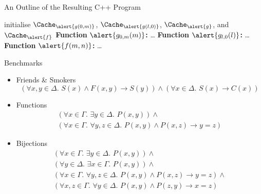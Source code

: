 \documentclass{beamer}
\begin{document}
\begin{frame}{An Outline of the Resulting C++ Program}
  \begin{algorithm}[H]
    initialise $\Cache_{\alert{g(0, m)}}$, $\Cache_{\alert{g(l, 0)}}$, $\Cache_{\alert{g}}$, and $\Cache_{\alert{f}}$\; \DontPrintSemicolon\pause
    \textbf{Function} $\alert{g_{0,m}(m)}$\textbf{:} \dots\;
    \textbf{Function} $\alert{g_{l,0}(l)}$\textbf{:} \dots\; \PrintSemicolon\pause
     \DontPrintSemicolon
    \textbf{Function} $\alert{f(m, n)}$\textbf{:} \dots\; \PrintSemicolon
  \end{algorithm}
\end{frame}

\begin{frame}{Benchmarks}
  \begin{itemize}
    \item Friends \& Smokers
          \[
          (\forall x,y \in \Delta\text{.
          } S(x) \land F(x, y) \to S(y)) \land (\forall x \in \Delta\text{.
          }S(x) \to C(x))
          \]
          \pause
    \item Functions
          \begin{gather*}
            (\forall x \in \Gamma\text{. }\exists y \in \Delta\text{. }P(x, y)) \land{}\\
            (\forall x \in \Gamma\text{. }\forall y, z \in \Delta\text{. }P(x, y) \land P(x, z) \to y = z)
          \end{gather*}
          \pause
    \item Bijections
          \begin{gather*}
            (\forall x \in \Gamma\text{. }\exists y \in \Delta\text{. }P(x, y))\land{}\\
            (\forall y \in \Delta\text{. }\exists x \in \Gamma\text{. }P(x, y))\land{}\\
            (\forall x \in \Gamma\text{. }\forall y, z \in \Delta\text{. }P(x, y) \land P(x, z) \to y = z)\land{}\\
            (\forall x, z \in \Gamma\text{. }\forall y \in \Delta\text{. }P(x, y) \land P(z, y) \to x = z)
          \end{gather*}
  \end{itemize}
\end{frame}
\end{document}

